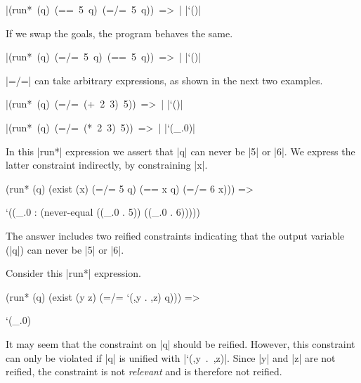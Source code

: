 \wspace

\noindent\mbox{\scheme|(run* (q) (== 5 q) (=/= 5 q)) => |} \mbox{\schemeresult|`()|}

\wspace

If we swap the goals, the program behaves the same.

\wspace

\noindent\mbox{\scheme|(run* (q) (=/= 5 q) (== 5 q)) => |} \mbox{\schemeresult|`()|}

\wspace

\mbox{\scheme|=/=|} can take arbitrary expressions, as shown in the next two examples.

\wspace

\noindent\mbox{\scheme|(run* (q) (=/= (+ 2 3) 5)) => |} \mbox{\schemeresult|`()|}

\wspace

\noindent\mbox{\scheme|(run* (q) (=/= (* 2 3) 5)) => |} \mbox{\schemeresult|`(_.0)|}

\wspace

In this \mbox{\scheme|run*|} expression we assert that
\mbox{\scheme|q|} can never be \mbox{\scheme|5|} or \mbox{\scheme|6|}.
We express the latter constraint indirectly, by constraining
\mbox{\scheme|x|}.

\schemedisplayspace
\begin{schemedisplay}
(run* (q)
  (exist (x)
    (=/= 5 q)
    (== x q)
    (=/= 6 x))) =>
\end{schemedisplay}
\nspace
\begin{schemeresponse}
`((_.0 : (never-equal ((_.0 . 5)) ((_.0 . 6)))))
\end{schemeresponse}

\noindent The answer includes two reified constraints indicating that the output
variable (\mbox{\scheme|q|}) can never be \mbox{\scheme|5|} or \mbox{\scheme|6|}.

\newpage

Consider this \mbox{\scheme|run*|} expression.

\schemedisplayspace
\begin{schemedisplay}
(run* (q)
  (exist (y z)
    (=/= `(,y . ,z) q))) =>
\end{schemedisplay}
\nspace
\begin{schemeresponse}
`(_.0)
\end{schemeresponse}

\noindent It may seem that the constraint on \mbox{\scheme|q|} should
be reified.  However, this constraint can only be violated if
\mbox{\scheme|q|} is unified with \mbox{\scheme|`(,y . ,z)|}.  Since
\mbox{\scheme|y|} and \mbox{\scheme|z|} are not reified, the
constraint is not \emph{relevant} and is therefore not reified.

